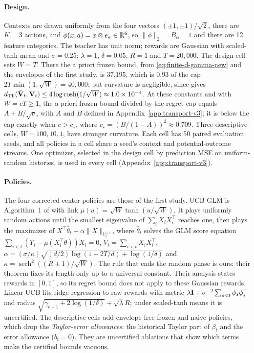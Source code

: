 \paragraph{Design.}
Contexts are drawn uniformly from the four vectors $(\pm1,\pm1)/\sqrt2$, there
are $K=3$ actions, and $\phi(x,a)=x\otimes e_a\in\mathbb{R}^6$, so $\|\phi\|_2=B_\phi=1$
and there are 12 feature categories. The teacher has unit norm; rewards are
Gaussian with scaled-tanh mean and $\sigma=0.25$; $\lambda=1$, $\delta=0.05$,
$R=1$ and $T=20{,}000$. The design cell sets $W=T$. There the a priori frozen
bound, from \eqref{eq:finite-d-gamma-new} and the envelopes of the first study,
is 37,195, which is 0.93 of the cap $2T\min(1,\sqrt W)=40{,}000$; but
curvature is negligible, since  gives
$d_{\rm Th}(\bar{\mathbf{V}}_t,\mathbf{V}_t)\le4\log\cosh(1/\sqrt W)\approx1.0\times10^{-4}$.
At these constants and with $W=cT\ge1$, the a priori frozen bound divided by
the regret cap equals $A+B/\sqrt c$, with $A$ and $B$ defined in
Appendix~\ref{app:transport-v3}; it is below the cap exactly when $c>c_\star$,
where $c_\star=(B/(1-A))^2\approx0.709$.
Three descriptive cells, $W=100,10,1$, have stronger curvature. Each cell has
50 paired evaluation seeds, and all policies in a cell share a seed's context
and potential-outcome streams. One optimizer, selected in the design cell by
prediction MSE on uniform-random histories, is used in every cell
(Appendix~\ref{app:transport-v3}).

\paragraph{Policies.}
The four corrected-center policies are those of the first study. UCB-GLM is
Algorithm~1 of \citet{li2017provably} with link $\mu(u)=\sqrt W\tanh(u/\sqrt W)$.
It plays uniformly random actions until the smallest eigenvalue of
$\sum_iX_iX_i^\top$ reaches one, then plays the maximizer of
$X^\top\hat\theta_t+\alpha\|X\|_{V_t^{-1}}$, where $\hat\theta_t$ solves the GLM
score equation $\sum_{i<t}(Y_i-\mu(X_i^\top\theta))X_i=0$,
$V_t=\sum_{i<t}X_iX_i^\top$, $\alpha=(\sigma/\kappa)\sqrt{(d/2)\log(1+2T/d)
+\log(1/\delta)}$ and $\kappa=\operatorname{sech}^2((R+1)/\sqrt W)$. The rule
that ends the random phase is ours: their theorem fixes its length only up to
a universal constant. Their analysis states rewards in $[0,1]$, so its regret
bound does not apply to these Gaussian rewards. Linear UCB fits ridge
regression to raw rewards with metric $\lambda\mathbf{I}+\sigma^{-2}\sum_{s<t}\phi_s
\phi_s^\top$ and radius $\sqrt{\gamma_{t-1}+2\log(1/\delta)}+\sqrt\lambda R$;
under scaled-tanh means it is uncertified. The descriptive cells add
envelope-free frozen and naive policies, which drop the \emph{Taylor-error
allowances}: the historical Taylor part of $\beta_t$ and the error allowance
($b_t=0$). They are uncertified ablations that show which terms make the
certified bounds vacuous.

